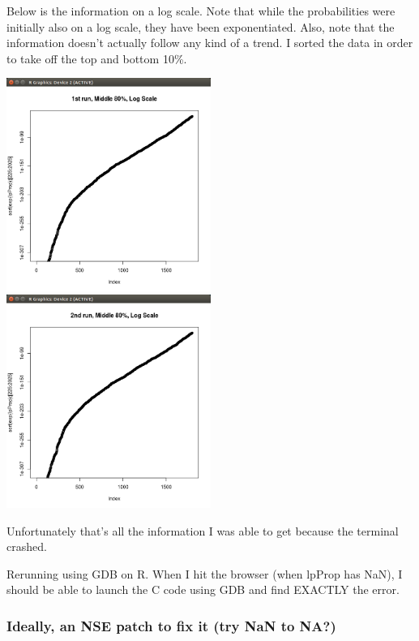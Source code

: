 \begin{enumerate}
Below is the information on a log scale. Note that while the probabilities were initially also on a log scale, they have been exponentiated. Also, note that the information doesn't actually follow any kind of a trend. I sorted the data in order to take off the top and bottom 10\%.

\includegraphics[width=0.5\textwidth]{data/middle80log1.png}
\includegraphics[width=0.5\textwidth]{data/middle80log2.png}

Unfortunately that's all the information I was able to get because the terminal crashed. 

Rerunning using GDB on R. When I hit the browser (when lpProp has NaN), I should be able to launch the C code using GDB and find EXACTLY the error.

\end{enumerate}







\subsubsection{Ideally, an NSE patch to fix it (try NaN to NA?)}

